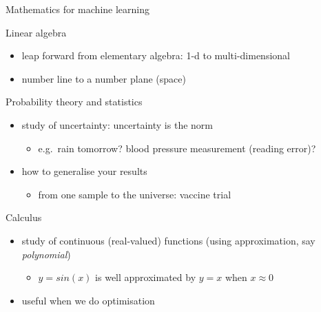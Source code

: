\documentclass[ignorenonframetext,]{beamer}
\providecommand{\tightlist}{%
  \setlength{\itemsep}{0pt}\setlength{\parskip}{0pt}}
\begin{document}
\begin{frame}{Mathematics for machine learning}
\protect\hypertarget{mathematics-for-machine-learning}{}

Linear algebra

\begin{itemize}
\tightlist
\item
  leap forward from elementary algebra: 1-d to multi-dimensional
\item
  number line to a number plane (space) 
\end{itemize}

\pause

\bigskip Probability theory and statistics

\begin{itemize}
\tightlist
\item
  study of uncertainty: uncertainty is the norm

  \begin{itemize}
  \tightlist
  \item
    e.g.~rain tomorrow? blood pressure measurement (reading error)?
  \end{itemize}
\item
  how to generalise your results

  \begin{itemize}
  \tightlist
  \item
    from one sample to the universe: vaccine trial
  \end{itemize}
\end{itemize}

\pause

\bigskip Calculus

\begin{itemize}
\tightlist
\item
  study of continuous (real-valued) functions (using approximation, say
  \emph{polynomial})

  \begin{itemize}
  \tightlist
  \item
    \(y= sin(x)\) is well approximated by \(y=x\) when \(x \approx 0\)
  \end{itemize}
\item
  useful when we do optimisation
\end{itemize}

\end{frame}
\end{document}
